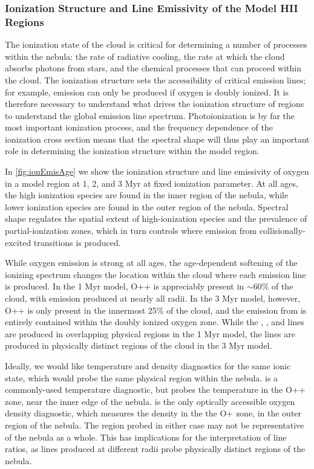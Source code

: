\subsubsection{Ionization Structure and Line Emissivity of the Model HII Regions}\label{sec:models:broad:ion}

The ionization state of the cloud is critical for determining a number of processes within the nebula: the rate of radiative cooling, the rate at which the cloud absorbs photons from stars, and the chemical processes that can proceed within the cloud. The ionization structure sets the accessibility of critical emission lines; for example, \oiii{} emission can only be produced if oxygen is doubly ionized. It is therefore necessary to understand what drives the ionization structure of \hii regions to understand the global emission line spectrum. Photoionization is by far the most important ionization process, and the frequency dependence of the ionization cross section means that the spectral shape will thus play an important role in determining the ionization structure within the model \hii region.

In \ref{fig:ionEmisAge} we show the ionization structure and line emissivity of oxygen in a model \hii region at 1, 2, and 3 Myr at fixed ionization parameter. At all ages, the high ionization species are found in the inner region of the nebula, while lower ionization species are found in the outer region of the nebula. Spectral shape regulates the spatial extent of high-ionization species and the prevalence of partial-ionization zones, which in turn controls where emission from collisionally-excited transitions is produced.

While oxygen emission is strong at all ages, the age-dependent softening of the ionizing spectrum changes the location within the cloud where each emission line is produced. In the 1 Myr model, O++ is appreciably present in $\sim 60\%$ of the cloud, with \oiii{} emission produced at nearly all radii. In the 3 Myr model, however, O++ is only present in the innermost 25\% of the cloud, and the emission from \oiii{} is entirely contained within the doubly ionized oxygen zone. While the \oi{}, \oii{}, and \oiii{} lines are produced in overlapping physical regions in the 1 Myr model, the lines are produced in physically distinct regions of the cloud in the 3 Myr model.

Ideally, we would like temperature and density diagnostics for the same ionic state, which would probe the same physical region within the nebula. \oiii{} is a commonly-used temperature diagnostic, but probes the temperature in the O++ zone, near the inner edge of the nebula. \oii{} is the only optically accessible oxygen density diagnostic, which measures the density in the the O+ zone, in the outer region of the nebula. The region probed in either case may not be representative of the nebula as a whole. This has implications for the interpretation of line ratios, as lines produced at different radii probe physically distinct regions of the nebula.

